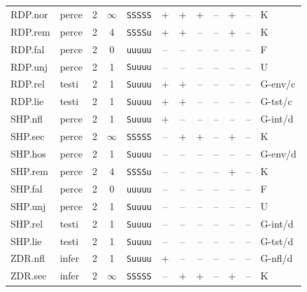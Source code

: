 {\begin{longtable}{@{}llcccccccccl@{}}
RDP.nor & perce & 2 & $\infty$ & \texttt{SSSSS} & \textsf{+} & \textsf{+} & \textsf{+} & \textsf{--} & \textsf{+} & -- & K \\
RDP.rem & perce & 2 & 4 & \texttt{SSSSu} & \textsf{+} & \textsf{+} & \textsf{--} & \textsf{--} & \textsf{+} & -- & K \\
RDP.fal & perce & 2 & 0 & \texttt{uuuuu} & \textsf{--} & \textsf{--} & \textsf{--} & \textsf{--} & \textsf{--} & -- & F \\
RDP.unj & perce & 2 & 1 & \texttt{Suuuu} & \textsf{--} & \textsf{--} & \textsf{--} & \textsf{--} & \textsf{--} & -- & U \\
RDP.rel & testi & 2 & 1 & \texttt{Suuuu} & \textsf{+} & \textsf{+} & \textsf{--} & \textsf{--} & \textsf{--} & -- & G-env/c \\
RDP.lie & testi & 2 & 1 & \texttt{Suuuu} & \textsf{+} & \textsf{+} & \textsf{--} & \textsf{--} & \textsf{--} & -- & G-tst/c \\
SHP.nfl & perce & 2 & 1 & \texttt{Suuuu} & \textsf{+} & \textsf{--} & \textsf{--} & \textsf{--} & \textsf{--} & -- & G-int/d \\
SHP.sec & perce & 2 & $\infty$ & \texttt{SSSSS} & \textsf{--} & \textsf{+} & \textsf{+} & \textsf{--} & \textsf{+} & -- & K \\
SHP.hos & perce & 2 & 1 & \texttt{Suuuu} & \textsf{--} & \textsf{--} & \textsf{--} & \textsf{--} & \textsf{--} & -- & G-env/d \\
SHP.rem & perce & 2 & 4 & \texttt{SSSSu} & \textsf{--} & \textsf{--} & \textsf{--} & \textsf{--} & \textsf{+} & -- & K \\
SHP.fal & perce & 2 & 0 & \texttt{uuuuu} & \textsf{--} & \textsf{--} & \textsf{--} & \textsf{--} & \textsf{--} & -- & F \\
SHP.unj & perce & 2 & 1 & \texttt{Suuuu} & \textsf{--} & \textsf{--} & \textsf{--} & \textsf{--} & \textsf{--} & -- & U \\
SHP.rel & testi & 2 & 1 & \texttt{Suuuu} & \textsf{--} & \textsf{--} & \textsf{--} & \textsf{--} & \textsf{--} & -- & G-int/d \\
SHP.lie & testi & 2 & 1 & \texttt{Suuuu} & \textsf{--} & \textsf{--} & \textsf{--} & \textsf{--} & \textsf{--} & -- & G-tst/d \\
ZDR.nfl & infer & 2 & 1 & \texttt{Suuuu} & \textsf{+} & \textsf{--} & \textsf{--} & \textsf{--} & \textsf{--} & -- & G-nfl/d \\
ZDR.sec & infer & 2 & $\infty$ & \texttt{SSSSS} & \textsf{--} & \textsf{+} & \textsf{+} & \textsf{--} & \textsf{+} & -- & K \\

\end{longtable}}
